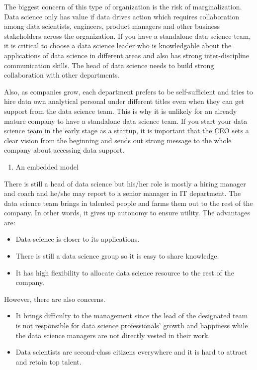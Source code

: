 \documentclass[12pt,]{krantz}
\providecommand{\tightlist}{%
  \setlength{\itemsep}{0pt}\setlength{\parskip}{0pt}}
\begin{document}
The biggest concern of this type of organization is the risk of marginalization. Data science only has value if data drives action which requires collaboration among data scientists, engineers, product managers and other business stakeholders across the organization. If you have a standalone data science team, it is critical to choose a data science leader who is knowledgable about the applications of data science in different areas and also has strong inter-discipline communication skills. The head of data science needs to build strong collaboration with other departments.

Also, as companies grow, each department prefers to be self-sufficient and tries to hire data own analytical personal under different titles even when they can get support from the data science team. This is why it is unlikely for an already mature company to have a standalone data science team. If you start your data science team in the early stage as a startup, it is important that the CEO sets a clear vision from the beginning and sends out strong message to the whole company about accessing data support.

\begin{enumerate}
\def\labelenumi{(\arabic{enumi})}
\setcounter{enumi}{1}
\tightlist
\item
  An embedded model
\end{enumerate}

There is still a head of data science but his/her role is mostly a hiring manager and coach and he/she may report to a senior manager in IT department. The data science team brings in talented people and farms them out to the rest of the company. In other words, it gives up autonomy to ensure utility. The advantages are:

\begin{itemize}
\tightlist
\item
  Data science is closer to its applications.
\item
  There is still a data science group so it is easy to share knowledge.
\item
  It has high flexibility to allocate data science resource to the rest of the company.
\end{itemize}

However, there are also concerns.

\begin{itemize}
\tightlist
\item
  It brings difficulty to the management since the lead of the designated team is not responsible for data science professionals' growth and happiness while the data science managers are not directly vested in their work.
\item
  Data scientists are second-class citizens everywhere and it is hard to attract and retain top talent.
\end{itemize}
\end{document}

